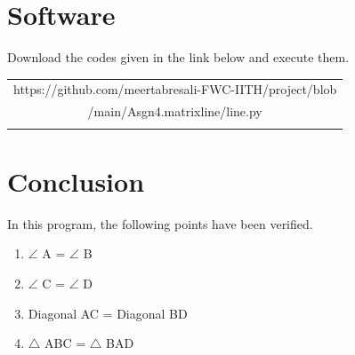 \documentclass[journal,10pt,twocolumn]{article}
\begin{document}

\section{Software}
\centering
Download the codes given in the link below and execute them.\\
\begin{table}[h]
\centering
\begin{tabular}{|c|} \hline
\rule{0pt}{10pt} 
https://github.com/meertabresali-FWC-IITH/project/blob \\
/main/Asgn4.matrixline/line.py\\
\\\hline
 \end{tabular}
\end{table}
\section{Conclusion}
\begin{flushleft}
In this program, the following points have been verified.\\
\vspace{0.1cm}
\begin{enumerate}
    \item $\angle$ A = $\angle$ B\\
    \item $\angle$ C = $\angle$ D\\
    \item Diagonal AC = Diagonal BD\\
    \item $\triangle$ ABC  = $\triangle$ BAD \\
\end{enumerate}
\end{flushleft}
\end{document}
